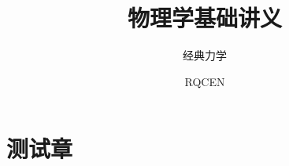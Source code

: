 \documentclass[color=green]{textbook-cn}%
\title{物理学基础讲义}
\subtitle{经典力学}
\author{RQCEN}
\begin{document}
\FontSize{14pt}%


\makecover


\maketitle


\frontmatter

\lipsum





\shorttableofcontents


\tableofcontents

\mainmatter


\lipsum
\begin{Definition}[定义名称]
\lipsum[1]
\end{Definition}


%
%
%
%
%
%
%
%






\lipsum[1]
\Example{\lipsum[1]}


\begin{Definition}[定义名称]
\lipsum[1]
\end{Definition}



\chapter{测试章}
\lipsum
\end{document}
